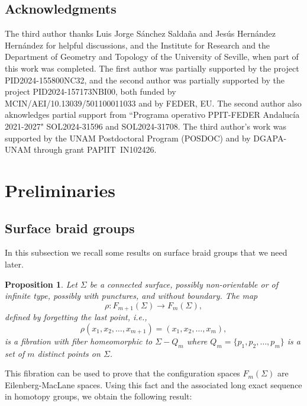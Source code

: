 \documentclass[a4paper,12pt,leqno]{amsart}
\newtheorem{proposition}[theorem]{Proposition}
\theoremstyle{definition}
\begin{document}
\subsection*{Acknowledgments} The third author thanks Luis Jorge Sánchez Saldaña 
and Jesús Hernández Hernández for helpful discussions, and the Institute for Research and the Department of Geometry and Topology of the University of Seville, when part of this work was completed. The first author was partially supported by the project PID2024-155800NC32, and the second author was partially supported by the project PID2024-157173NBI00, both funded by MCIN/AEI/10.13039/501100011033 and by FEDER, EU. The second author also aknowledges partial support from “Programa operativo PPIT-FEDER Andalucía 2021-2027" SOL2024-31596 and SOL2024-31708. The third author's work 
was supported by the UNAM Postdoctoral Program (POSDOC) and by DGAPA-UNAM through 
grant PAPIIT~IN102426.



\section{Preliminaries}\label{prelimi}

\subsection{Surface braid groups} In this subsection we recall some results on surface braid groups that we need later.


\begin{proposition}\cite{Fadell1962}\cite[Lemma 1.27, Exercise 1.4.1 ]{kassel2008}
Let \( \Sigma \) be a connected surface, possibly non-orientable or of infinite type, possibly with punctures, and without boundary. The map
\[
\rho: F_{m+1}(\Sigma) \to F_m(\Sigma),
\]
defined by forgetting the last point, i.e.,
\[
\rho(x_1, x_2, \dots, x_{m+1}) = (x_1, x_2, \dots, x_m),
\]
is a fibration with fiber homeomorphic to \( \Sigma - Q_m \) where \( Q_m = \{p_1, p_2, \dots, p_m\} \) is a set of \( m \) distinct points on \( \Sigma \).
\end{proposition}

This fibration can be used to prove that the configuration spaces \( F_m(\Sigma) \) are Eilenberg-MacLane spaces. Using this fact and the associated long exact sequence in homotopy groups, we obtain the following result:
\end{document}
